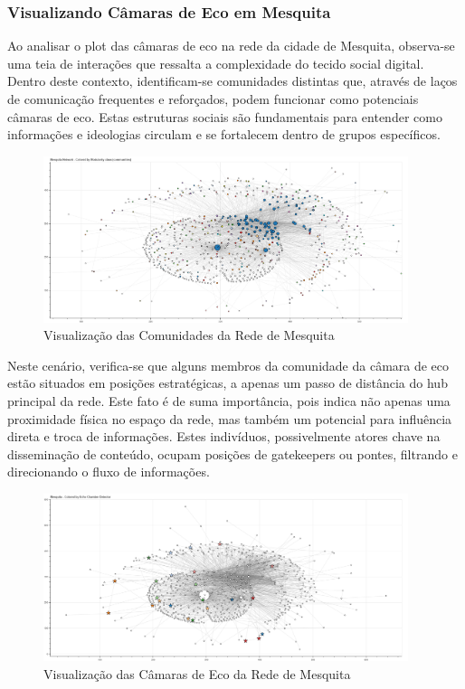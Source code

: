 \subsubsection*{Visualizando Câmaras de Eco em Mesquita}

Ao analisar o plot das câmaras de eco na rede da cidade de Mesquita, observa-se uma teia de interações que ressalta a complexidade do tecido social digital. Dentro deste contexto, identificam-se comunidades distintas que, através de laços de comunicação frequentes e reforçados, podem funcionar como potenciais câmaras de eco. Estas estruturas sociais são fundamentais para entender como informações e ideologias circulam e se fortalecem dentro de grupos específicos.

\begin{figure}[htb]
	\centering
	\includegraphics[width=0.95\textwidth]{images/network_communities_mesquita.png}
	\caption{Visualização das Comunidades da Rede de Mesquita}
	\label{fig:network_communities_mesquita}
\end{figure}

Neste cenário, verifica-se que alguns membros da comunidade da câmara de eco estão situados em posições estratégicas, a apenas um passo de distância do hub principal da rede. Este fato é de suma importância, pois indica não apenas uma proximidade física no espaço da rede, mas também um potencial para influência direta e troca de informações. Estes indivíduos, possivelmente atores chave na disseminação de conteúdo, ocupam posições de gatekeepers ou pontes, filtrando e direcionando o fluxo de informações.

\begin{figure}[htb]
	\centering
	\includegraphics[width=0.95\textwidth]{images/echo_chambers_mesquita.png}
	\caption{Visualização das Câmaras de Eco da Rede de Mesquita}
	\label{fig:echo_chambers_mesquita}
\end{figure}

